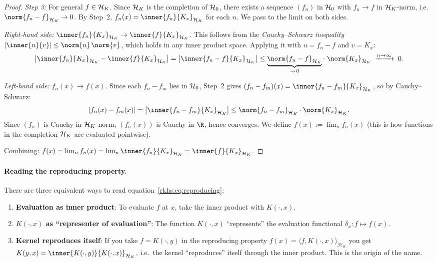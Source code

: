 \begin{notechapter}
\begin{proof}
\emph{Step 3:} For general $f \in \mathcal{H}_K$. Since $\mathcal{H}_K$
is the completion of $\mathcal{H}_0$, there exists a
sequence $(f_n)$ in $\mathcal{H}_0$ with
$f_n \to f$ in $\mathcal{H}_K$-norm, i.e.\
$\norm{f_n - f}_{\hk} \to 0$. By Step~2,
$f_n(x) = \inner{f_n}{K_x}_{\hk}$ for each $n$.
We pass to the limit on both sides.

\emph{Right-hand side:}
$\inner{f_n}{K_x}_{\hk} \to \inner{f}{K_x}_{\hk}$.
This follows from the \emph{Cauchy--Schwarz
inequality} $|\inner{u}{v}| \leq \norm{u}\,\norm{v}$,
which holds in any inner product space. Applying it
with $u = f_n - f$ and $v = K_x$:
\[
\bigl|\inner{f_n}{K_x}_{\hk}
  - \inner{f}{K_x}_{\hk}\bigr|
= \bigl|\inner{f_n - f}{K_x}_{\hk}\bigr|
\leq \underbrace{\norm{f_n - f}_{\hk}}_{\to\, 0}
  \cdot\; \norm{K_x}_{\hk}
\;\xrightarrow{n \to \infty}\; 0.
\]

\emph{Left-hand side:}
$f_n(x) \to f(x)$. Since each $f_n - f_m$ lies in
$\mathcal{H}_0$, Step~2 gives
$(f_n - f_m)(x) = \inner{f_n - f_m}{K_x}_{\hk}$,
so by Cauchy--Schwarz:
\[
|f_n(x) - f_m(x)|
= \bigl|\inner{f_n - f_m}{K_x}_{\hk}\bigr|
\leq \norm{f_n - f_m}_{\hk} \cdot \norm{K_x}_{\hk}.
\]
Since $(f_n)$ is Cauchy in $\mathcal{H}_K$-norm,
$(f_n(x))$ is Cauchy in $\R$, hence converges.
We define $f(x) := \lim_n f_n(x)$ (this is how
functions in the completion $\mathcal{H}_K$ are evaluated
pointwise).

Combining: $f(x) = \lim_{n} f_n(x)
= \lim_{n} \inner{f_n}{K_x}_{\hk}
= \inner{f}{K_x}_{\hk}$.
\end{proof}

\paragraph{Reading the reproducing property.} There are three equivalent
ways to read equation~\eqref{rkhs:eq:reproducing}:
\begin{enumerate}[label=(\alph*)]
  \item \textbf{Evaluation as inner product}: To evaluate $f$ at $x$,
  take the inner product with $K(\cdot, x)$.
  \item \textbf{$K(\cdot, x)$ as ``representer of evaluation''}: The
  function $K(\cdot, x)$ ``represents'' the evaluation functional
  $\delta_x: f \mapsto f(x)$.
  \item \textbf{Kernel reproduces itself}: If you take $f = K(\cdot, y)$
  in the reproducing property
  $f(x) = \langle f, K(\cdot, x) \rangle_{\mathcal{H}_K}$
  you get $K(y,x) = \inner{K(\cdot,y)}{K(\cdot,x)}_{\hk}$, i.e.\ the
  kernel ``reproduces'' itself through the inner product. This is the
  origin of the name.
\end{enumerate}


\end{notechapter}
